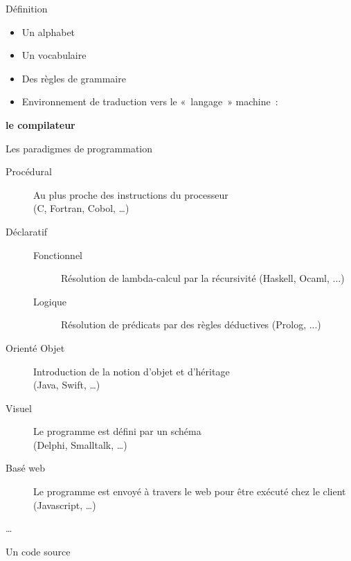 \begin{frame}{Définition}
    \begin{itemize}
        \item Un alphabet
        \item Un vocabulaire
        \item Des règles de grammaire
        \item Environnement de traduction vers le « langage » machine~:
    \end{itemize}
    \begin{center}
        \textbf{le compilateur}
    \end{center}
\end{frame}

\begin{frame}{Les paradigmes de programmation}
    \begin{description}
        \item[Procédural] Au plus proche des instructions du processeur 
                        \\(C, Fortran, Cobol, …)
        \item[Déclaratif]
        \begin{description}
            \item[Fonctionnel] Résolution de lambda-calcul par la récursivité (Haskell, Ocaml, ...)
            \item[Logique] Résolution de prédicats par des règles déductives (Prolog, ...)
        \end{description}
        \item[Orienté Objet] Introduction de la notion d'objet et d'héritage
                            \\(Java, Swift, …)
        \item[Visuel] Le programme est défini par un schéma 
                    \\(Delphi, Smalltalk, …)
        \item[Basé web] Le programme est envoyé à travers le web pour être exécuté chez le client (Javascript, …)
        \item[…]
    \end{description}
\end{frame}

\begin{frame}{Un code source}
\end{frame}
